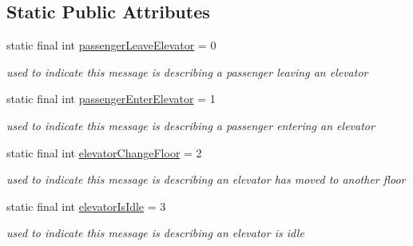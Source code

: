 \subsection*{Static Public Attributes}
\begin{DoxyCompactItemize}
\item 
\mbox{\label{classcn_1_1leonwong_1_1_elevator_simulator_1_1_model_1_1_message_a8ff9f9824b15bd10efe3770f39a136dc}} 
static final int \hyperlink{classcn_1_1leonwong_1_1_elevator_simulator_1_1_model_1_1_message_a8ff9f9824b15bd10efe3770f39a136dc}{passenger\+Leave\+Elevator} = 0
\begin{DoxyCompactList}\small\item\em used to indicate this message is describing a passenger leaving an elevator \end{DoxyCompactList}\item 
\mbox{\label{classcn_1_1leonwong_1_1_elevator_simulator_1_1_model_1_1_message_a3e7e9d33eaa7f246158d4b2151945379}} 
static final int \hyperlink{classcn_1_1leonwong_1_1_elevator_simulator_1_1_model_1_1_message_a3e7e9d33eaa7f246158d4b2151945379}{passenger\+Enter\+Elevator} = 1
\begin{DoxyCompactList}\small\item\em used to indicate this message is describing a passenger entering an elevator \end{DoxyCompactList}\item 
\mbox{\label{classcn_1_1leonwong_1_1_elevator_simulator_1_1_model_1_1_message_aa2a04ac8a674b25966e29d05099afc16}} 
static final int \hyperlink{classcn_1_1leonwong_1_1_elevator_simulator_1_1_model_1_1_message_aa2a04ac8a674b25966e29d05099afc16}{elevator\+Change\+Floor} = 2
\begin{DoxyCompactList}\small\item\em used to indicate this message is describing an elevator has moved to another floor \end{DoxyCompactList}\item 
\mbox{\label{classcn_1_1leonwong_1_1_elevator_simulator_1_1_model_1_1_message_a182e2c484b12304f0a091ad7d11deb33}} 
static final int \hyperlink{classcn_1_1leonwong_1_1_elevator_simulator_1_1_model_1_1_message_a182e2c484b12304f0a091ad7d11deb33}{elevator\+Is\+Idle} = 3
\begin{DoxyCompactList}\small\item\em used to indicate this message is describing an elevator is idle \end{DoxyCompactList}\end{DoxyCompactItemize}



